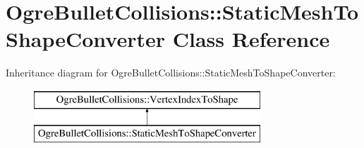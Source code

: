 \hypertarget{class_ogre_bullet_collisions_1_1_static_mesh_to_shape_converter}{\section{Ogre\-Bullet\-Collisions\-:\-:Static\-Mesh\-To\-Shape\-Converter Class Reference}
\label{class_ogre_bullet_collisions_1_1_static_mesh_to_shape_converter}
}
Inheritance diagram for Ogre\-Bullet\-Collisions\-:\-:Static\-Mesh\-To\-Shape\-Converter\-:\begin{figure}[H]
\begin{center}
\leavevmode
\includegraphics[height=2.000000cm]{class_ogre_bullet_collisions_1_1_static_mesh_to_shape_converter}
\end{center}
\end{figure}
